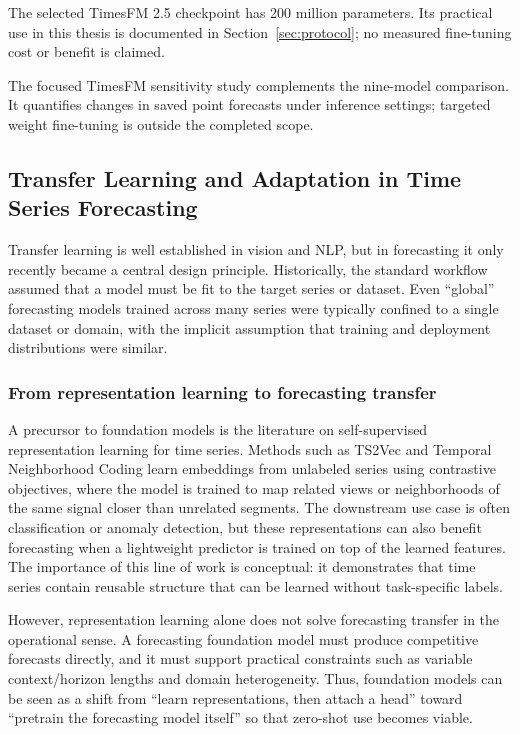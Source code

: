The selected TimesFM 2.5 checkpoint has 200 million parameters. Its practical use in this thesis is documented in Section~\ref{sec:protocol}; no measured fine-tuning cost or benefit is claimed.

The focused TimesFM sensitivity study complements the nine-model comparison. It quantifies changes in saved point forecasts under inference settings; targeted weight fine-tuning is outside the completed scope.

\subsection{Transfer Learning and Adaptation in Time Series Forecasting}

Transfer learning is well established in vision and NLP, but in forecasting it only recently became a central design principle. Historically, the standard workflow assumed that a model must be fit to the target series or dataset. Even ``global'' forecasting models trained across many series were typically confined to a single dataset or domain, with the implicit assumption that training and deployment distributions were similar.

\subsubsection{From representation learning to forecasting transfer}
A precursor to foundation models is the literature on self-supervised representation learning for time series. Methods such as TS2Vec and Temporal Neighborhood Coding learn embeddings from unlabeled series using contrastive objectives, where the model is trained to map related views or neighborhoods of the same signal closer than unrelated segments. The downstream use case is often classification or anomaly detection, but these representations can also benefit forecasting when a lightweight predictor is trained on top of the learned features. The importance of this line of work is conceptual: it demonstrates that time series contain reusable structure that can be learned without task-specific labels.

However, representation learning alone does not solve forecasting transfer in the operational sense. A forecasting foundation model must produce competitive forecasts directly, and it must support practical constraints such as variable context/horizon lengths and domain heterogeneity. Thus, foundation models can be seen as a shift from ``learn representations, then attach a head'' toward ``pretrain the forecasting model itself'' so that zero-shot use becomes viable.

